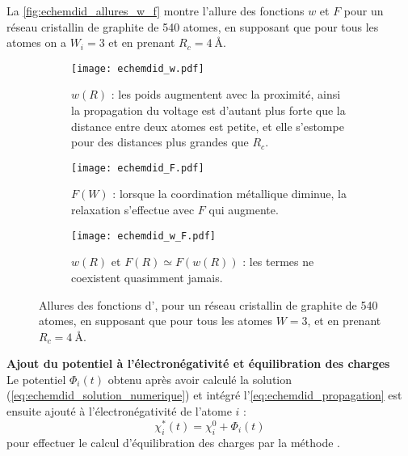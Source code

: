 La \autoref{fig:echemdid_allures_w_f} montre l'allure des fonctions $w$ et $F$ pour un réseau cristallin de graphite de \num{540} atomes, en supposant que pour tous les atomes on a $W_i = \num{3}$ et en prenant $R_c = \qty{4}{\angstrom}$.

\begin{figure}[h!]
    \centering
    \begin{subfigure}{\textwidth}
        \centering
        \texttt{[image: echemdid\_w.pdf]}
        \caption{$w(R)$ : {\footnotesize les poids augmentent avec la proximité, ainsi la propagation du voltage est d'autant plus forte que la distance entre deux atomes est petite, et elle s'estompe pour des distances plus grandes que $R_c$.}}
    \end{subfigure}
    \begin{subfigure}{\textwidth}
        \centering
        \texttt{[image: echemdid\_F.pdf]}
        \caption{$F(W)$ : {\footnotesize lorsque la coordination métallique diminue, la relaxation s'effectue avec $F$ qui augmente.}}
    \end{subfigure}
    \begin{subfigure}{\textwidth}
        \centering
        \texttt{[image: echemdid\_w\_F.pdf]}
        \caption{$w(R)$ et $F(R) \simeq F(w(R))$ : {\footnotesize les termes ne coexistent quasimment jamais.}}
    \end{subfigure}
    \caption{Allures des fonctions d'\echemdid{}, {\footnotesize pour un réseau cristallin de graphite de \num{540} atomes, en supposant que pour tous les atomes $W = \num{3}$, et en prenant $R_c = \qty{4}{\angstrom}$.}}
    \label{fig:echemdid_allures_w_f}
\end{figure}

\textbf{Ajout du potentiel à l'électronégativité et équilibration des charges}\\
Le potentiel $\Phi_i (t)$ obtenu après avoir calculé la solution (\ref{eq:echemdid_solution_numerique}) et intégré l'\autoref{eq:echemdid_propagation} est ensuite ajouté à l'électronégativité de l'atome $i$ :
\begin{equation*}
    \boxed%
    {
        \chi_i^* (t) = \chi_i^0 + \Phi_i (t)
    }
\end{equation*}
pour effectuer le calcul d'équilibration des charges par la méthode \qeq{}.
